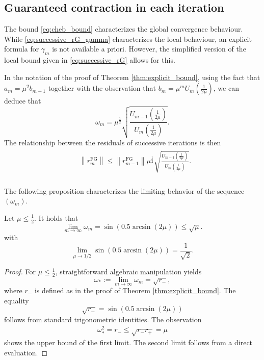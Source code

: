 \documentclass{siamart251216}
\begin{document}
{\subsection{Guaranteed contraction in each iteration}
The bound \eqref{eq:cheb_bound} characterizes the global convergence behaviour. While \eqref{eq:successive_rG_gamma} characterizes the local behaviour, an explicit formula for $\gamma_m$ is not available a priori. However, the simplified version of the local bound given in \eqref{eq:successive_rG} allows for this. 

\begin{corollary}\label{cor:localrate}
    In the notation of the proof of Theorem \ref{thm:explicit_bound}, using the fact that $a_m = \mu^2 b_{m-1}$ together with the observation that $b_{m} = \mu^{m} U_{m}\left(\frac{1}{2\mu}\right)$, we can deduce that
    $$\omega_m = \mu^{\frac{1}{2}} \sqrt{\frac{U_{m-1}\left(\frac{1}{2\mu}\right)}{U_{m}\left(\frac{1}{2\mu}\right)}}.$$
    The relationship between the residuals of successive iterations is then
    \begin{align}
        \begin{aligned}
             & \left\|r_m^{\mathrm{FG}}\right\| \leq \left\|r_{m-1}^{\mathrm{FG}}\right\| \mu^{\frac{1}{2}} \sqrt{\frac{U_{m-1}\left(\frac{1}{2\mu}\right)}{U_{m}\left(\frac{1}{2\mu}\right)}}. \\
        \end{aligned}
    \end{align}
\end{corollary}
The following proposition characterizes the limiting behavior of the sequence~$(\omega_m)$.

\begin{proposition} \label{prop:mu_range}
    Let $\mu \leq \frac{1}{2}.$ It holds that
\[
\lim_{m \to \infty} \omega_m = \sin(0.5 \arcsin(2\mu)) \leq \sqrt{\mu}.
\]
with
\[
 \lim_{\mu \to 1/2} \sin(0.5 \arcsin(2\mu)) = \frac{1}{\sqrt{2}}.
\]
\end{proposition}
\begin{proof}
    For $\mu \leq \frac{1}{2}$, straightforward algebraic manipulation yields
    $$\omega_* := \lim_{m \to \infty} \omega_m = \sqrt{r_-},$$ where $r_-$ is defined as in the proof of Theorem \ref{thm:explicit_bound}. The equality $$\sqrt{r_-} = \sin(0.5 \arcsin(2\mu))$$ follows from standard trigonometric identities. The observation
    \begin{align*}
        \omega_*^2 = r_- \leq \sqrt{r_- r_+} = \mu
    \end{align*}
    shows the upper bound of the first limit. The second limit follows from a direct evaluation.
\end{proof}

}
\end{document}
